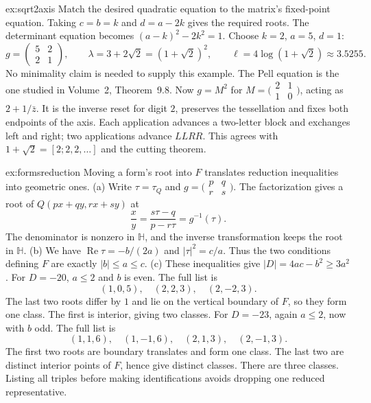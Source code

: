 \begin{solution}{ex:sqrt2axis}
\idea Match the desired quadratic equation to the matrix's fixed-point equation.
\writeup Taking $c=b=k$ and $d=a-2k$ gives the required roots. The determinant equation becomes $(a-k)^2-2k^2=1$. Choose $k=2$, $a=5$, $d=1$:
\[
g=\begin{pmatrix}5&2\\2&1\end{pmatrix},\qquad
\lambda=3+2\sqrt2=(1+\sqrt2)^2,\qquad
\ell=4\log(1+\sqrt2)\approx3.5255.
\]
No minimality claim is needed to supply this example. The Pell equation is the one studied in Volume~2, Theorem~9.8. Now $g=M^2$ for $M=\bigl(\begin{smallmatrix}2&1\\1&0\end{smallmatrix}\bigr)$, acting as $2+1/\bar z$. It is the inverse reset for digit $2$, preserves the tessellation and fixes both endpoints of the axis. Each application advances a two-letter block and exchanges left and right; two applications advance $LLRR$. This agrees with $1+\sqrt2=[2;2,2,\ldots]$ and the cutting theorem.
\end{solution}

\begin{solution}{ex:formsreduction}
\idea Moving a form's root into $F$ translates reduction inequalities into geometric ones.
\writeup (a) Write $\tau=\tau_Q$ and $g=\bigl(\begin{smallmatrix}p&q\\r&s\end{smallmatrix}\bigr)$. The factorization gives a root of $Q(px+qy,rx+sy)$ at
\[
\frac{x}{y}=\frac{s\tau-q}{p-r\tau}=g^{-1}(\tau).
\]
The denominator is nonzero in $\mathbb H$, and the inverse transformation keeps the root in $\mathbb H$.
(b) We have $\operatorname{Re}\tau=-b/(2a)$ and $|\tau|^2=c/a$. Thus the two conditions defining $F$ are exactly $|b|\le a\le c$.
(c) These inequalities give $|D|=4ac-b^2\ge3a^2$. For $D=-20$, $a\le2$ and $b$ is even. The full list is
\[
(1,0,5),\quad(2,2,3),\quad(2,-2,3).
\]
The last two roots differ by $1$ and lie on the vertical boundary of $F$, so they form one class. The first is interior, giving two classes.
For $D=-23$, again $a\le2$, now with $b$ odd. The full list is
\[
(1,1,6),\quad(1,-1,6),\quad(2,1,3),\quad(2,-1,3).
\]
The first two roots are boundary translates and form one class. The last two are distinct interior points of $F$, hence give distinct classes. There are three classes. Listing all triples before making identifications avoids dropping one reduced representative.
\end{solution}

